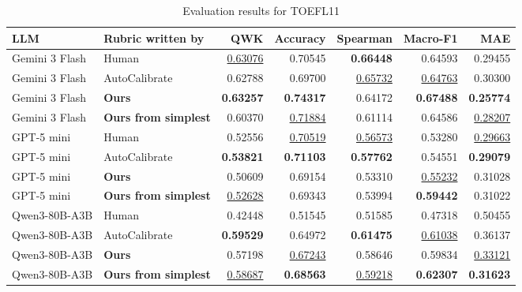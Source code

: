 \begin{table}[t]
\centering
\caption{Evaluation results for TOEFL11}
\begin{tabular}{llrrrrr}
\toprule
LLM & Rubric written by & QWK & Accuracy & Spearman & Macro-F1 & MAE \\
\midrule
Gemini 3 Flash & Human & \underline{0.63076} & 0.70545 & \textbf{0.66448} & 0.64593 & 0.29455 \\
Gemini 3 Flash & AutoCalibrate & 0.62788 & 0.69700 & \underline{0.65732} & \underline{0.64763} & 0.30300 \\
Gemini 3 Flash & \textbf{Ours} & \textbf{0.63257} & \textbf{0.74317} & 0.64172 & \textbf{0.67488} & \textbf{0.25774} \\
Gemini 3 Flash & \textbf{Ours from simplest} & 0.60370 & \underline{0.71884} & 0.61114 & 0.64586 & \underline{0.28207} \\
\midrule
GPT-5 mini & Human & 0.52556 & \underline{0.70519} & \underline{0.56573} & 0.53280 & \underline{0.29663} \\
GPT-5 mini & AutoCalibrate & \textbf{0.53821} & \textbf{0.71103} & \textbf{0.57762} & 0.54551 & \textbf{0.29079} \\
GPT-5 mini & \textbf{Ours} & 0.50609 & 0.69154 & 0.53310 & \underline{0.55232} & 0.31028 \\
GPT-5 mini & \textbf{Ours from simplest} & \underline{0.52628} & 0.69343 & 0.53994 & \textbf{0.59442} & 0.31022 \\
\midrule
Qwen3-80B-A3B & Human & 0.42448 & 0.51545 & 0.51585 & 0.47318 & 0.50455 \\
Qwen3-80B-A3B & AutoCalibrate & \textbf{0.59529} & 0.64972 & \textbf{0.61475} & \underline{0.61038} & 0.36137 \\
Qwen3-80B-A3B & \textbf{Ours} & 0.57198 & \underline{0.67243} & 0.58646 & 0.59834 & \underline{0.33121} \\
Qwen3-80B-A3B & \textbf{Ours from simplest} & \underline{0.58687} & \textbf{0.68563} & \underline{0.59218} & \textbf{0.62307} & \textbf{0.31623} \\
\bottomrule
\end{tabular}
\end{table}
